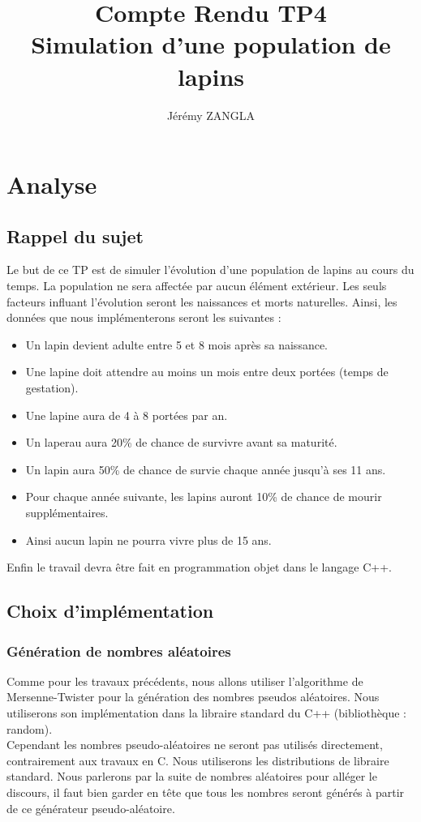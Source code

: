 \documentclass[11)pt,a4paper]{article}
\title{Compte Rendu TP4\\Simulation d'une population de lapins}
\author{Jérémy ZANGLA}
\begin{document}
\maketitle
\pagebreak
\tableofcontents
\pagebreak

\section{Analyse}
    \subsection{Rappel du sujet}
        Le but de ce TP est de simuler l'évolution d'une population de lapins au cours du temps.
        La population ne sera affectée par aucun élément extérieur. Les seuls facteurs influant l'évolution seront les naissances et morts naturelles.
        Ainsi, les données que nous implémenterons seront les suivantes : 
        \begin{itemize}
            \item Un lapin devient adulte entre 5 et 8 mois après sa naissance.
            \item Une lapine doit attendre au moins un mois entre deux portées (temps de gestation).
            \item Une lapine aura de 4 à 8 portées par an.
            \item Un laperau aura 20\% de chance de survivre avant sa maturité.
            \item Un lapin aura 50\% de chance de survie chaque année jusqu'à ses 11 ans.
            \item Pour chaque année suivante, les lapins auront 10\% de chance de mourir supplémentaires.
            \item Ainsi aucun lapin ne pourra vivre plus de 15 ans.
        \end{itemize}
        Enfin le travail devra être fait en programmation objet dans le langage C++.
    \subsection{Choix d'implémentation}
        \subsubsection{Génération de nombres aléatoires}
            Comme pour les travaux précédents, nous allons utiliser l'algorithme de Mersenne-Twister pour la génération des nombres pseudos aléatoires.
            Nous utiliserons son implémentation dans la libraire standard du C++ (bibliothèque : random). 
            \\
            Cependant les nombres pseudo-aléatoires ne seront pas utilisés directement, contrairement aux travaux en C. Nous utiliserons les distributions de libraire standard.
            Nous parlerons par la suite de nombres aléatoires pour alléger le discours, il faut bien garder en tête que tous les nombres seront générés à partir de ce générateur pseudo-aléatoire.
\end{document}
